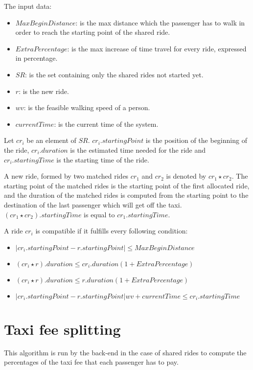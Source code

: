 The input data:
\begin{itemize}
	\item $MaxBeginDistance$: is the max distance which the passenger has to walk in order to reach the starting point of the shared ride.
	\item $ExtraPercentage$: is the max increase of time travel for every ride, expressed in percentage.
	\item $SR$: is the set containing only the shared rides not started yet.
	\item $r$: is the new ride.
	\item $wv$: is the feasible walking speed of a person.
	\item $currentTime$: is the current time of the system.
\end{itemize}

Let $cr_i$ be an element of $SR$. $cr_i.startingPoint$ is the position of the beginning of the ride, $cr_i.duration$ is the estimated time needed for the ride and $cr_i.startingTime$ is the starting time of the ride.

A new ride, formed by two matched rides $cr_1$ and $cr_2$ is denoted by $ cr_1 \star cr_2 $. The starting point of the matched rides is the starting point of the first allocated ride, and the duration of the matched rides is computed from the starting point to the destination of the last passenger which will get off the taxi. $ (cr_1 \star cr_2).startingTime $ is equal to $cr_1.startingTime$.

A ride $cr_i$ is compatible if it fulfills every following condition:
\begin{itemize}
	\item $| cr_i.startingPoint - r.startingPoint | \leq MaxBeginDistance$
	\item $(cr_i \star r).duration  \leq cr_i.duration( 1+ ExtraPercentage)$
	\item $(cr_i \star r).duration  \leq r.duration( 1+ ExtraPercentage)$
	\item $ | cr_i.startingPoint - r.startingPoint | wv +currentTime \leq cr_i.startingTime$
\end{itemize}


\section{Taxi fee splitting}
This algorithm is run by the back-end in the case of shared rides to compute the percentages of the taxi fee that each passenger has to pay.


